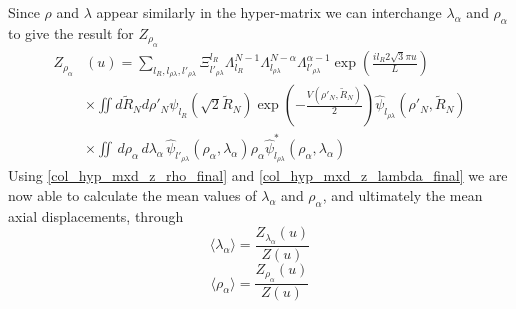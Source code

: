 %
Since $\rho$ and $\lambda$ appear similarly in the hyper-matrix we can interchange $\lambda_{\alpha}$ and $\rho_{\alpha}$ to give the result for $Z_{\rho_{\alpha}}$
%
\begin{align}\label{col_hyp_mxd_z_rho_final}
Z_{\rho_{\alpha}}& \left(u\right)= \sum_{l_R,l_{\rho\lambda},l'_{\rho\lambda}}\Xi_{l'_{\rho\lambda}}^{l_{R}}\Lambda_{l_{R}}^{N-1}\Lambda_{l_{\rho\lambda}}^{N-\alpha}\Lambda_{l'_{\rho\lambda}}^{\alpha-1}\exp\left(\frac{il_{R}2\sqrt{3}\pi u}{L}\right)\nonumber\\
&\times\iint d\tilde{R}_N d\rho'_N\psi_{l_R}\left(\sqrt{2}\tilde{R}_N\right)\exp\left(-\frac{V\left(\rho'_{N},\tilde{R}_N\right)}{2}\right)\hat{\psi}_{l_{\rho\lambda}}\left(\rho'_{N},\tilde{R}_N\right)\nonumber\\
&\times\iint\,d\rho_{\alpha}\,d\lambda_{\alpha}\,\hat{\psi}_{l'_{\rho\lambda}}\left(\rho_{\alpha},\lambda_{\alpha}\right)\rho_{\alpha}\hat{\psi}^{*}_{l_{\rho\lambda}}\left(\rho_{\alpha},\lambda_{\alpha}\right)
\end{align}
%
Using \eqref{col_hyp_mxd_z_rho_final} and \eqref{col_hyp_mxd_z_lambda_final} we are now able to calculate the mean values of $\lambda_\alpha$ and $\rho_\alpha$, and ultimately the mean axial displacements, through
%
\begin{equation}
\langle\lambda_{\alpha}\rangle = \frac{Z_{\lambda_\alpha}\left(u\right)}{Z\left(u\right)}
\end{equation}  
%
\begin{equation}
\langle\rho_{\alpha}\rangle = \frac{Z_{\rho_\alpha}\left(u\right)}{Z\left(u\right)}
\end{equation}
%
